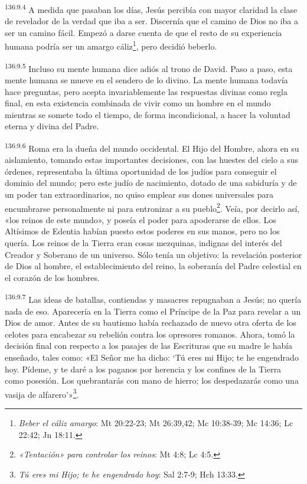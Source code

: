\par 
\textsuperscript{136:9.4} A medida que pasaban los días, Jesús percibía con mayor claridad la clase de revelador de la verdad que iba a ser. Discernía que el camino de Dios no iba a ser un camino fácil. Empezó a darse cuenta de que el resto de su experiencia humana podría ser un amargo cáliz\footnote{\textit{Beber el cáliz amargo}: Mt 20:22-23; Mt 26:39,42; Mc 10:38-39; Mc 14:36; Lc 22:42; Jn 18:11.}, pero decidió beberlo.

\par 
\textsuperscript{136:9.5} Incluso su mente humana dice adiós al trono de David. Paso a paso, esta mente humana se mueve en el sendero de lo divino. La mente humana todavía hace preguntas, pero acepta invariablemente las respuestas divinas como regla final, en esta existencia combinada de vivir como un hombre en el mundo mientras se somete todo el tiempo, de forma incondicional, a hacer la voluntad eterna y divina del Padre.

\par 
\textsuperscript{136:9.6} Roma era la dueña del mundo occidental. El Hijo del Hombre, ahora en su aislamiento, tomando estas importantes decisiones, con las huestes del cielo a sus órdenes, representaba la última oportunidad de los judíos para conseguir el dominio del mundo; pero este judío de nacimiento, dotado de una sabiduría y de un poder tan extraordinarios, no quiso emplear sus dones universales para encumbrarse personalmente ni para entronizar a su pueblo\footnote{\textit{«Tentación» para controlar los reinos}: Mt 4:8; Lc 4:5.}. Veía, por decirlo así, «los reinos de este mundo», y poseía el poder para apoderarse de ellos. Los Altísimos de Edentia habían puesto estos poderes en sus manos, pero no los quería. Los reinos de la Tierra eran cosas mezquinas, indignas del interés del Creador y Soberano de un universo. Sólo tenía un objetivo: la revelación posterior de Dios al hombre, el establecimiento del reino, la soberanía del Padre celestial en el corazón de los hombres.

\par 
\textsuperscript{136:9.7} Las ideas de batallas, contiendas y masacres repugnaban a Jesús; no quería nada de eso. Aparecería en la Tierra como el Príncipe de la Paz para revelar a un Dios de amor. Antes de su bautismo había rechazado de nuevo otra oferta de los celotes para encabezar su rebelión contra los opresores romanos. Ahora, tomó la decisión final con respecto a los pasajes de las Escrituras que su madre le había enseñado, tales como: «El Señor me ha dicho: `Tú eres mi Hijo; te he engendrado hoy. Pídeme, y te daré a los paganos por herencia y los confines de la Tierra como posesión. Los quebrantarás con mano de hierro; los despedazarás como una vasija de alfarero'»\footnote{\textit{Tú eres mi Hijo; te he engendrado hoy}: Sal 2:7-9; Hch 13:33.}.

